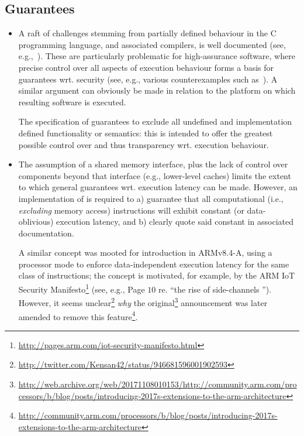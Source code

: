 
\subsection{Guarantees}
\label{sec:bg:guarantee}

\begin{itemize}

\item A raft of challenges stemming from partially defined behaviour in the
      C programming language, and associated compilers, is well documented
      (see, e.g.,~\cite[Section 2.1]{SCARV:SimChiAnd:18}).
      These are particularly problematic for high-assurance software, where
      precise control over all aspects of execution behaviour forms a basis
      for guarantees wrt. security
      (see, e.g., various counterexamples such as~\cite{SCARV:KPVV:16}).
      A similar argument can obviously be made in relation to the platform 
      on which resulting software is executed.

      The specification of \XCRYPTO guarantees to exclude all
                   undefined 
      and
      implementation defined
      functionality or semantics:
      this is intended to offer the greatest possible control over and thus
      transparency wrt. execution behaviour.

\item The assumption of a shared memory interface, plus the lack of control
      over components beyond that interface 
      (e.g., lower-level caches) 
      limits the extent to which general guarantees wrt. execution latency 
      can be made.  However, an implementation of \XCRYPTO is required to 
      a) guarantee that all computational 
         (i.e., {\em excluding} memory access) 
         instructions will exhibit constant (or data-oblivious) execution 
         latency,
         and
      b) clearly quote said constant in associated documentation.

      A similar concept was mooted for introduction in ARMv8.4-A, using a
      processor mode to enforce data-independent execution latency for the
      same class of instructions; the concept is motivated, for example,
      by the ARM IoT Security Manifesto\footnote{
      \url{http://pages.arm.com/iot-security-manifesto.html}
      } (see, e.g., Page $10$ re. ``the rise of side-channels '').
      However, it seems unclear\footnote{
      \url{http://twitter.com/Kensan42/status/946681596001902593}
      } {\em why} the original\footnote{
      \url{http://web.archive.org/web/20171108010153/http://community.arm.com/processors/b/blog/posts/introducing-2017s-extensions-to-the-arm-architecture}
      } announcement was later amended to remove this feature\footnote{
      \url{http://community.arm.com/processors/b/blog/posts/introducing-2017s-extensions-to-the-arm-architecture}
      }.

\end{itemize}

